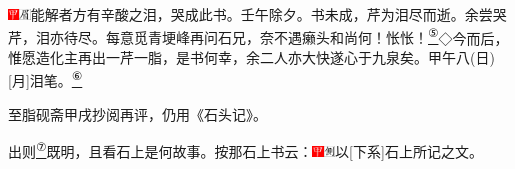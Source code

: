{\includegraphics[width=3mm]{../Images/00002}\includegraphics[width=3mm]{../Images/00010}\footnotesize \kaishu 能解者方有辛酸之泪，哭成此书。壬午除夕。书未成，芹为泪尽而逝。余尝哭芹，泪亦待尽。每意觅青埂峰再问石兄，奈不遇癞头和尚何！怅怅！}\href{../Text/part0005_split_000.html\#lnkback_5_a}{\textsuperscript{⑤}}{{◇今而后，惟愿造化主再出一芹一脂，是书何幸，余二人亦大快遂心于九泉矣。甲午八{(日)}{[}月{]}泪笔。}}\href{../Text/part0005_split_000.html\#lnkback_6_a}{\textsuperscript{⑥}}

至脂砚斋甲戌抄阅再评，仍用《石头记》。

出则\href{../Text/part0005_split_000.html\#lnkback_7_a}{\textsuperscript{⑦}}既明，且看石上是何故事。按那石上书云：{\includegraphics[width=3mm]{../Images/00002}\includegraphics[width=3mm]{../Images/00011}\footnotesize \kaishu 以{[}下系{]}石上所记之文。}

